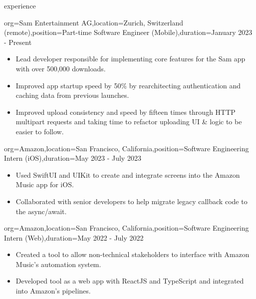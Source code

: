\documentclass{resume}
\begin{document}
%
\pagebreak
\makeheader

\newcommand{\skill}[2]{\textbf{#1} - #2}


\begin{ResumeSection}{experience}
    \begin{ResumeSubsection}{org={Sam Entertainment AG},location={Zurich,
        Switzerland (remote)},position={Part-time Software Engineer (Mobile)},duration={January
    2023 - Present}}
        \begin{itemize}
            \item Lead developer responsible for implementing core features for the Sam app with over 500,000
                downloads.
            \item Improved app startup speed by 50\% by rearchitecting
                authentication and caching data from previous launches.
            \item Improved upload consistency and speed by
                fifteen times through HTTP multipart requests and taking time to refactor
                uploading UI \& logic to be easier to follow.
        \end{itemize}
    \end{ResumeSubsection}

    \begin{ResumeSubsection}{org={Amazon},location={San Francisco,
        California},position={Software Engineering Intern (iOS)},duration={May 2023 -
    July 2023}}
        \begin{itemize}
            \item Used SwiftUI and UIKit to create and integrate screens into
                the Amazon Music app for iOS.
            \item Collaborated with senior developers to help migrate legacy
                callback code to the async/await.
        \end{itemize}
    \end{ResumeSubsection}
    \begin{ResumeSubsection}{org={Amazon},location={San Francisco,
        California},position={Software Engineering Intern (Web)},duration={May 2022 - July 2022}}
        \begin{itemize}
            \item Created a tool to allow
                non-technical stakeholders to interface with Amazon Music's automation
                system.
            \item Developed tool as a web app with ReactJS and TypeScript and integrated
                into Amazon's pipelines.
        \end{itemize}
    \end{ResumeSubsection}


\end{ResumeSection}
\end{document}
